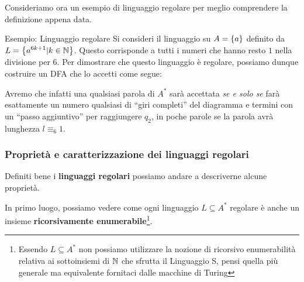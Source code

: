 \newpage

Consideriamo ora un esempio di linguaggio regolare per meglio comprendere la definizione appena data.

\begin{generalbox}[colframe=azure-gradient-3!90!black]{Esempio: Linguaggio regolare}
  Si consideri il linguaggio su \(A=\displaystyle{\left\{{a}\right\}}\) definito da \(L=\displaystyle{\left\{{a^{6k+1} \vert k \in \mathbb{N}}\right\}}\). Questo corrisponde a tutti i numeri che hanno resto \(1\) nella divisione per \(6\). Per dimostrare che questo linguaggio è regolare, possiamo dunque costruire un DFA che lo accetti come segue:

  \medskip
  \begin{center}
  \end{center}

  Avremo che infatti una qualsiasi parola di \(A^*\) sarà accettata \textit{se e solo se} farà esattamente un numero qualsiasi di ``giri completi'' del diagramma e termini con un ``passo aggiuntivo'' per raggiungere \(q_2\), in poche parole se la parola avrà lunghezza \(l \equiv_6 1\).
\end{generalbox}

\subsubsection{Proprietà e caratterizzazione dei linguaggi regolari}

Definiti bene i \textbf{linguaggi regolari} possiamo andare a descriverne alcune proprietà.

In primo luogo, possiamo vedere come ogni linguaggio \(L\subseteq A^*\) regolare è anche un insieme \textbf{ricorsivamente enumerabile}\footnote{ Essendo \(L\subseteq A^*\) non possiamo utilizzare la nozione di ricorsivo enumerabilità relativa ai sottoinsiemi di \(\mathbb{N}\) che sfrutta il Linguaggio S, pensi quella più generale ma equivalente fornitaci dalle macchine di Turing}.

